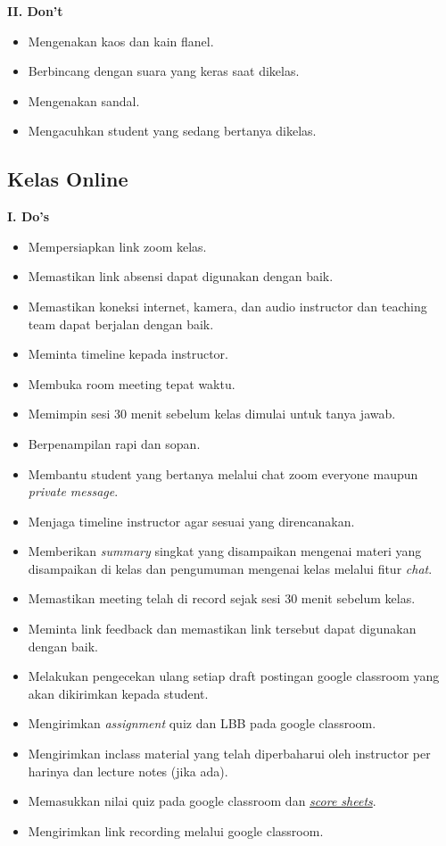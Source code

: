 \documentclass[
]{book}
\providecommand{\tightlist}{%
  \setlength{\itemsep}{0pt}\setlength{\parskip}{0pt}}
\begin{document}
\textbf{II. Don't}

\begin{itemize}
\tightlist
\item
  Mengenakan kaos dan kain flanel.
\item
  Berbincang dengan suara yang keras saat dikelas.
\item
  Mengenakan sandal.
\item
  Mengacuhkan student yang sedang bertanya dikelas.
\end{itemize}

\hypertarget{kelas-online-4}{%
\subsection{Kelas Online}\label{kelas-online-4}}

\textbf{I. Do's}

\begin{itemize}
\tightlist
\item
  Mempersiapkan link zoom kelas.
\item
  Memastikan link absensi dapat digunakan dengan baik.
\item
  Memastikan koneksi internet, kamera, dan audio instructor dan teaching team dapat berjalan dengan baik.
\item
  Meminta timeline kepada instructor.
\item
  Membuka room meeting tepat waktu.
\item
  Memimpin sesi 30 menit sebelum kelas dimulai untuk tanya jawab.
\item
  Berpenampilan rapi dan sopan.
\item
  Membantu student yang bertanya melalui chat zoom everyone maupun \emph{private message}.
\item
  Menjaga timeline instructor agar sesuai yang direncanakan.
\item
  Memberikan \emph{summary} singkat yang disampaikan mengenai materi yang disampaikan di kelas dan pengumuman mengenai kelas melalui fitur \emph{chat}.
\item
  Memastikan meeting telah di record sejak sesi 30 menit sebelum kelas.
\item
  Meminta link feedback dan memastikan link tersebut dapat digunakan dengan baik.
\item
  Melakukan pengecekan ulang setiap draft postingan google classroom yang akan dikirimkan kepada student.
\item
  Mengirimkan \emph{assignment} quiz dan LBB pada google classroom.
\item
  Mengirimkan inclass material yang telah diperbaharui oleh instructor per harinya dan lecture notes (jika ada).
\item
  Memasukkan nilai quiz pada google classroom dan \href{https://docs.google.com/spreadsheets/d/1cGJ0pn9k9gKCBnceWVwaL9D7BBDMNjLh8uPYlaBlJi8/edit\#gid=1518964141}{\emph{score sheets}}.
\item
  Mengirimkan link recording melalui google classroom.
\end{itemize}
\end{document}

